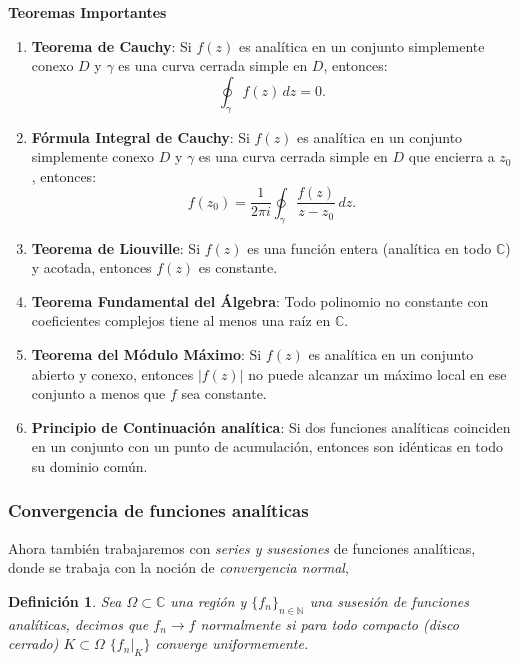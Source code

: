 \documentclass[letterpaper]{book}
\newtheorem{def.}{Definici\'on}[section]
\newcommand{\nat}{\ensuremath{ \mathbb N }}
\newcommand{\om}{\ensuremath{\Omega}}
\newcommand{\co}{\ensuremath{\mathbb C }}
\begin{document}
\noindent\textbf{Teoremas Importantes}

\begin{enumerate}
\item \textbf{Teorema de Cauchy}:
Si \(f(z)\) es analítica en un conjunto simplemente conexo \(D\) y \(\gamma\) es una curva cerrada simple en \(D\), entonces:
\[
\oint_\gamma f(z) \, dz = 0.
\]

\item \textbf{Fórmula Integral de Cauchy}:
Si \(f(z)\) es analítica en un conjunto simplemente conexo \(D\) y \(\gamma\) es una curva cerrada simple en \(D\) que encierra a \(z_0\), entonces:
\[
f(z_0) = \frac{1}{2\pi i} \oint_\gamma \frac{f(z)}{z - z_0} \, dz.
\]

\item \textbf{Teorema de Liouville}:
Si \(f(z)\) es una función entera (analítica en todo \(\mathbb{C}\)) y acotada, entonces \(f(z)\) es constante.

\item \textbf{Teorema Fundamental del Álgebra}:
Todo polinomio no constante con coeficientes complejos tiene al menos una raíz en \(\mathbb{C}\).

\item \textbf{Teorema del Módulo Máximo}:
Si \(f(z)\) es analítica en un conjunto abierto y conexo, entonces \(|f(z)|\) no puede alcanzar un máximo local en ese conjunto a menos que \(f\) sea constante.

\item \textbf{Principio de Continuación analítica}:
Si dos funciones analíticas coinciden en un conjunto con un punto de acumulación, entonces son idénticas en todo su dominio común.
\end{enumerate}
\subsubsection{Convergencia de funciones analíticas}
\noindent Ahora también trabajaremos con \emph{series y susesiones} de funciones analíticas, donde se trabaja con la noción de \emph{convergencia normal},
\begin{def.}
Sea \(\om\subset\co\) una región y \(\{f_n\}_{n\in\nat}\) una susesión de funciones analíticas, decimos que \(f_n\to f\) \emph{normalmente} si para todo compacto (disco cerrado) \(K\subset\om\)
\(\{f_n|_{K}\}\) converge \emph{uniformemente}.
\end{def.}

\end{document}
